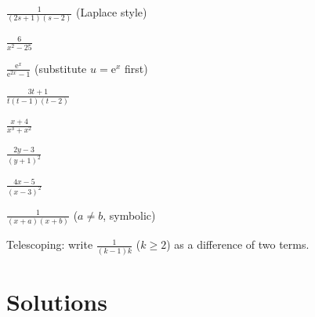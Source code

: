 \begin{problems}
  \item $\displaystyle\frac{1}{(2s+1)(s-2)}$ (Laplace style)
  \item $\displaystyle\frac{6}{x^{2}-25}$
  \item $\displaystyle\frac{\mathrm{e}^{x}}{\mathrm{e}^{2x}-1}$
        (substitute $u=\mathrm{e}^{x}$ first)
  \item $\displaystyle\frac{3t+1}{t(t-1)(t-2)}$
  \item $\displaystyle\frac{x+4}{x^{3}+x^{2}}$
  \item $\displaystyle\frac{2y-3}{(y+1)^{2}}$
  \item $\displaystyle\frac{4x-5}{(x-3)^{2}}$
  \item $\displaystyle\frac{1}{(x+a)(x+b)}$ ($a\neq b$, symbolic)
  \item Telescoping: write $\displaystyle\frac{1}{(k-1)k}$ ($k\ge 2$) as a
        difference of two terms.
\end{problems}

\section{Solutions}


